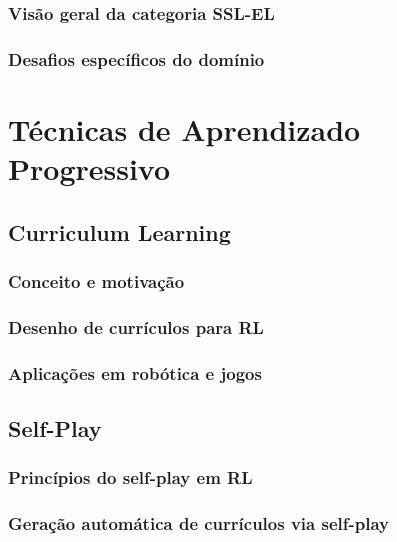 \subsubsection{Visão geral da categoria SSL-EL}
\label{subsubsec:ssl_el}

\subsubsection{Desafios específicos do domínio}
\label{subsubsec:desafios_dominio}

\section{Técnicas de Aprendizado Progressivo}
\label{sec:aprendizado_prog}

\subsection{Curriculum Learning}
\label{subsec:curriculum}

\subsubsection{Conceito e motivação}
\label{subsubsec:curriculum_conceito}

\subsubsection{Desenho de currículos para RL}
\label{subsubsec:curriculum_desenho}

\subsubsection{Aplicações em robótica e jogos}
\label{subsubsec:curriculum_aplicacoes}

\subsection{Self-Play}
\label{subsec:self_play}

\subsubsection{Princípios do self-play em RL}
\label{subsubsec:self_play_principios}

\subsubsection{Geração automática de currículos via self-play}
\label{subsubsec:self_play_curriculos}

